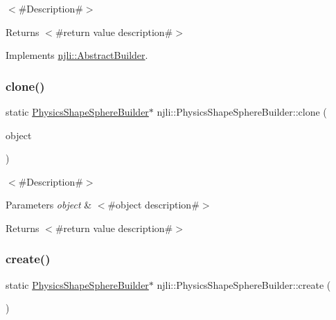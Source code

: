 $<$\#\+Description\#$>$

\begin{DoxyReturn}{Returns}
$<$\#return value description\#$>$ 
\end{DoxyReturn}


Implements \mbox{\hyperlink{classnjli_1_1_abstract_builder_aa1d220053e182c37b31b427499c6eacf}{njli\+::\+Abstract\+Builder}}.

\mbox{\label{classnjli_1_1_physics_shape_sphere_builder_ae1435ea0dbbf0be68a238e248b87b2ce}} 
\subsubsection{\texorpdfstring{clone()}{clone()}}
{\footnotesize\ttfamily static \mbox{\hyperlink{classnjli_1_1_physics_shape_sphere_builder}{Physics\+Shape\+Sphere\+Builder}}$\ast$ njli\+::\+Physics\+Shape\+Sphere\+Builder\+::clone (\begin{DoxyParamCaption}\item[{const \mbox{\hyperlink{classnjli_1_1_physics_shape_sphere_builder}{Physics\+Shape\+Sphere\+Builder}} \&}]{object }\end{DoxyParamCaption})\hspace{0.3cm}{\ttfamily [static]}}

$<$\#\+Description\#$>$


\begin{DoxyParams}{Parameters}
{\em object} & $<$\#object description\#$>$\\
\hline
\end{DoxyParams}
\begin{DoxyReturn}{Returns}
$<$\#return value description\#$>$ 
\end{DoxyReturn}
\mbox{\label{classnjli_1_1_physics_shape_sphere_builder_a6d95dd09fe39bf985fa616042eb10cc2}} 
\subsubsection{\texorpdfstring{create()}{create()}}
{\footnotesize\ttfamily static \mbox{\hyperlink{classnjli_1_1_physics_shape_sphere_builder}{Physics\+Shape\+Sphere\+Builder}}$\ast$ njli\+::\+Physics\+Shape\+Sphere\+Builder\+::create (\begin{DoxyParamCaption}{ }\end{DoxyParamCaption})\hspace{0.3cm}{\ttfamily [static]}}

